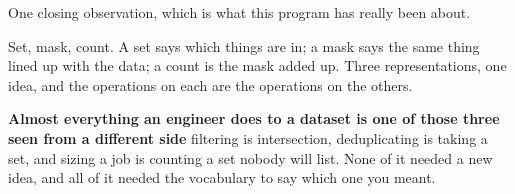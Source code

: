 \begin{fr}
One closing observation, which is what this program has really been about.

Set, mask, count. A set says which things are in; a mask says the same thing
lined up with the data; a count is the mask added up. Three representations,
one idea, and the operations on each are the operations on the others.

\textbf{Almost everything an engineer does to a dataset is one of those three
seen from a different side} \dash{} filtering is intersection, deduplicating
is taking a set, and sizing a job is counting a set nobody will list. None of
it needed a new idea, and all of it needed the vocabulary to say which one you
meant.
\end{fr}


